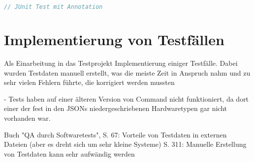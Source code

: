 \begin{lstlisting}[caption=Ein Test in JUnit mit Annotationen, label=JUnit-Test,language=Java]
    // JUnit Test mit Annotation
\end{lstlisting}

\section{Implementierung von Testfällen}\label{sec:testimplementierung}
Als Einarbeitung in das Testprojekt Implementierung einiger Testfälle. Dabei wurden Testdaten manuell erstellt, was die meiste Zeit in Anspruch nahm und zu sehr vielen Fehlern führte, die korrigiert werden mussten

- Tests haben auf einer älteren Version von Command nicht funktioniert, da dort einer der fest in den JSONs niedergeschriebenen Hardwaretypen gar nicht vorhanden war. 

Buch "QA durch Softwaretests", S. 67: Vorteile von Testdaten in externen Dateien (aber es dreht sich um sehr kleine Systeme)
S. 311: Manuelle Erstellung von Testdaten kann sehr aufwändig werden